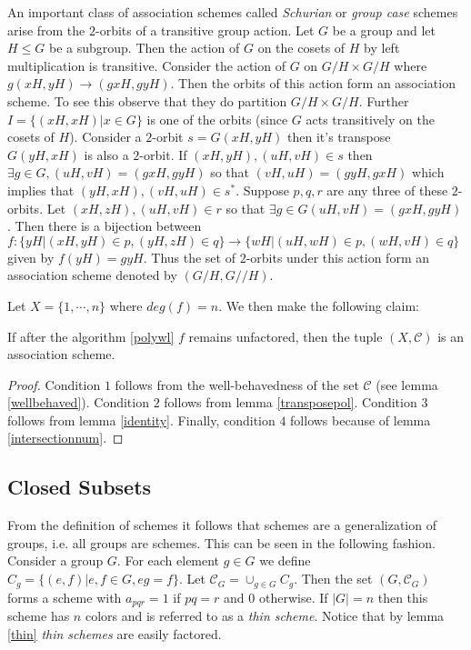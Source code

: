 	\begin{example}\label{schurian}
			An important class of association schemes called \emph{Schurian} or \emph{group case} schemes arise from the $2$-orbits of a transitive group action. Let $G$ be a group and let $H \le G$ be a subgroup.
			Then the action of $G$ on the cosets of $H$ by left multiplication is transitive. Consider the action of $G$ on $G/H \times
			G/H$ where $g(xH,yH) \rightarrow (gxH,gyH)$. Then the orbits of this action form an association scheme. To see this observe that they do partition $G/H \times G/H$. Further $I = \{(xH,xH)|x \in G\}$ is
			one of the orbits (since $G$ acts 
			transitively on the cosets of $H$). Consider a $2$-orbit $s=G(xH,yH)$ then it's transpose $G(yH,xH)$ is also a $2$-orbit. If $(xH,yH),(uH,vH)\in s$ then $\exists g \in G, (uH,vH)=(gxH,gyH)$ so that
			$(vH,uH)=(gyH,gxH)$ which implies that $(yH,xH),(vH,uH) \in s^*$. Suppose $p,q,r$ are any three of these $2$-orbits. Let $(xH,zH),(uH,vH) \in r$ so that $\exists g \in G (uH,vH)=(gxH,gyH)$. Then there is a
			bijection between $f:\{yH|(xH,yH)\in p, (yH,zH) \in q \} \rightarrow \{wH|(uH,wH) \in p,(wH,vH)\in q\}$ given by $f(yH)=gyH$. Thus the set of $2$-orbits under this action form an association scheme 
			denoted by $(G/H,G//H)$.
	\end{example}


	
	Let $X=\{1,\cdots,n\}$ where $deg(f)=n$. We then make the following claim:
	\begin{lemma}
		If after the algorithm \ref{polywl} $f$ remains unfactored, then the tuple $(X,\mathcal{C})$ is an association scheme.
	 \end{lemma}

	\begin{proof}
		Condition $1$ follows from the well-behavedness of the set $\mathcal{C}$ (see lemma \ref{wellbehaved}). Condition $2$ follows from lemma \ref{transposepol}. Condition $3$ follows from lemma \ref{identity}. Finally,
		condition $4$ follows because of lemma \ref{intersectionnum}.
	\end{proof}




	\subsection{Closed Subsets}\label{sec:subset}
      From the definition of schemes it follows that schemes are a generalization of groups, i.e. all groups are schemes. This can be seen in the following fashion. Consider a group $G$. For each element $g \in G$
      we define $C_g=\{(e,f)|e,f\in G,eg=f\}$. Let $\mathcal{C}_G=\cup_{g \in G}C_g$. Then the set $(G,\mathcal{C}_G)$ forms a scheme with $a_{pqr}=1$ if $pq=r$ and $0$ otherwise. If $|G|=n$ then this scheme has $n$ colors and is
      referred to as a \emph{thin scheme}. Notice that by lemma \ref{thin} \emph{thin schemes} are easily factored. 

